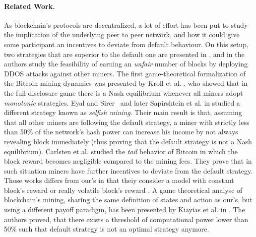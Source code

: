 \paragraph*{\bf Related Work.} As blockchain's protocols are decentralized, a lot of effort has been put to study the implication of the underlying peer to peer network, and how it could give some participant an incentives to deviate from default behaviour. On this setup, two strategies that are superior to the default one are presented in \cite{bitcoin_attacks_2013}, and in\cite{ddos_attacks2014,empirical_dos_attacks2014} the authors study the feasibility of earning an \emph{unfair} number of blocks by deploying DDOS attacks against other miners. The first game-theoretical formalization of the Bitcoin mining dynamics was presented by Kroll et al. \cite{economics_of_mining2013}, who showed that in the full-disclosure game there is a Nash equilibrium whenever all miners adopt \emph{monotonic} strategies. Eyal and Sirer~\cite{selfishmining2014}  and later Sapirshtein et al. in \cite{optimalselfishmining2017} studied a different strategy known as \emph{selfish mining}. Their main result is that, assuming that all other miners are following the default strategy, a miner with strictly less than 50\% of the network's hash power can increase his income by not always revealing block immediately (thus proving that the default strategy is not a Nash equilibrium). Carlsten et al. \cite{instabilitywithoutreward:2016} studied the \emph{tail} behavior of Bitcoin in which the block reward becomes negligible compared to the mining fees. They prove that in such situation miners have further incentives to deviate from the default strategy. Those works differs from our's in that theiy consider a model with constant block's reward \cite{selfishmining2014,optimalselfishmining2017} or really volatile block's reward \cite{nstabilitywithoutreward:2016}. A game theoretical analyse of blockchain's mining, sharing the same definition of states and action as our's, but using a different payoff paradigm, has been presented by Kiayias et al. in \cite{mininggames:2016}. The authors proved, that there exists a threshold of computational power lower than 50\% such that default strategy is not an optimal strategy anymore. 